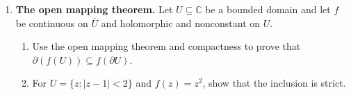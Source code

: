 \documentclass[11pt,reqno]{amsart}
\newcommand{\C}{\mathbb{C}}
\begin{document}
\begin{enumerate}
\item \textbf{The open mapping theorem.}
Let $U\subseteq\C$ be a bounded domain and let $f$ be continuous on
$\overline U$ and holomorphic and nonconstant on $U$.
\begin{enumerate}
\item Use the open mapping theorem and compactness to prove that
$\partial(f(U))\subseteq f(\partial U)$.
\item For $U=\{z:|z-1|<2\}$ and $f(z)=z^2$, show that the inclusion is strict.
\end{enumerate}

\end{enumerate}
\end{document}
